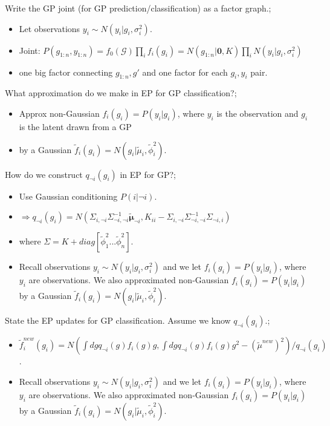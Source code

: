 \documentclass{article}
\begin{document}
Write the GP joint (for GP prediction/classification) as a factor graph.; \begin{itemize} \item Let observations $y_i \sim N(y_i | g_i, \sigma^2_i)$. \item Joint: $P(g_{1:n}, y_{1:n}) = f_0(\mathcal{G})\prod_i f_i(g_i) = N(g_{1:n}|\mathbf{0}, K) \prod_i N(y_i|g_i, \sigma^2_i)$ \item one big factor connecting $g_{1:n}, g'$ and one factor for each $g_i, y_i$ pair. \end{itemize}

What approximation do we make in EP for GP classification?; \begin{itemize} \item Approx non-Gaussian $f_i(g_i) = P(y_i|g_i)$, where $y_i$ is the observation and $g_i$ is the latent drawn from a GP \item by a Gaussian $\tilde{f}_i(g_i) = N(g_i | \tilde{\mu}_i, \tilde{\phi}^2_i)$. \end{itemize}

How do we construct $q_{\neg i}(g_i)$ in EP for GP?; \begin{itemize} \item Use Gaussian conditioning $P(i | \neg i)$. \item $\Rightarrow q_{\neg i}(g_i) = N(\Sigma_{i, \neg i}\Sigma^{-1}_{\neg i, \neg i} \mathbf{\tilde{\mu}}_{\neg i}, K_{ii}-\Sigma_{i, \neg i}\Sigma^{-1}_{\neg i, \neg i}\Sigma_{\neg i, i})$ \item where $\Sigma = K + diag[\tilde{\phi}^2_1...\tilde{\phi}^2_n]$. \item Recall observations $y_i \sim N(y_i | g_i, \sigma^2_i)$ and we let $f_i(g_i) = P(y_i|g_i)$, where $y_i$ are observations. We also approximated non-Gaussian $f_i(g_i) = P(y_i|g_i)$ by a Gaussian $\tilde{f}_i(g_i) = N(g_i | \tilde{\mu}_i, \tilde{\phi}^2_i)$. \end{itemize} 

State the EP updates for GP classification. Assume we know $q_{\neg i}(g_i)$.; \begin{itemize} \item $\tilde{f}_i^{new}(g_i) = N(\int dg q_{\neg i}(g)f_i(g)g, \int dg q_{\neg i}(g)f_i(g)g^2 - (\tilde{\mu}^{new})^2)/q_{\neg i}(g_i)$. \item Recall observations $y_i \sim N(y_i | g_i, \sigma^2_i)$ and we let $f_i(g_i) = P(y_i|g_i)$, where $y_i$ are observations. We also approximated non-Gaussian $f_i(g_i) = P(y_i|g_i)$ by a Gaussian $\tilde{f}_i(g_i) = N(g_i | \tilde{\mu}_i, \tilde{\phi}^2_i)$. \end{itemize} 
\end{document}
